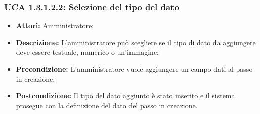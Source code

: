 \subsubsection{UCA 1.3.1.2.2: Selezione del tipo del dato}
\begin{itemize}
\item \textbf{Attori:}
 Amministratore;
\item \textbf{Descrizione:} 
L'amministratore può scegliere se il tipo di dato da aggiungere deve essere testuale, numerico o un'immagine; 
\item \textbf{Precondizione:} 
L'amministratore vuole aggiungere un campo dati al passo in creazione;
\item \textbf{Postcondizione:} 
Il tipo del dato aggiunto è stato inserito e il sistema prosegue con la definizione del dato del passo in creazione.
\end{itemize}

\hypertarget{A1.3.1.3}{}
